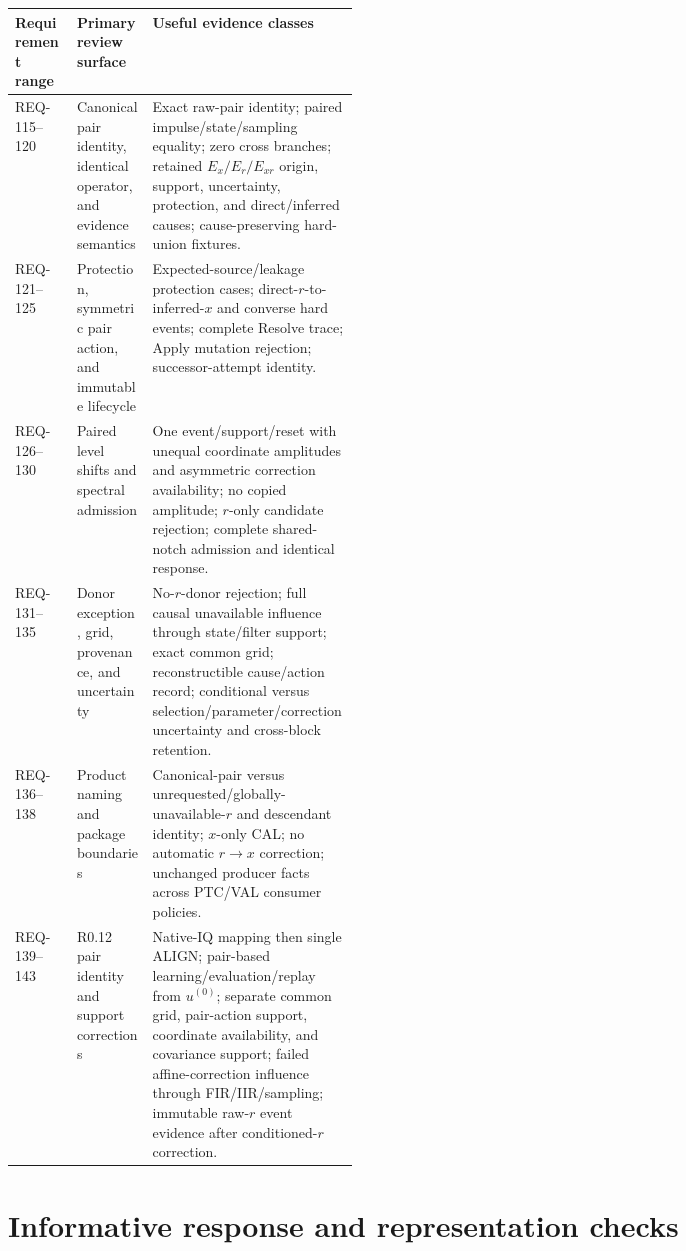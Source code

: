 \documentclass[10pt]{article}
\begin{document}
\clearpage
\footnotesize
\begin{tabularx}{\linewidth}{@{}p{0.18\linewidth}p{0.22\linewidth}X@{}}
\toprule
Requirement range & Primary review surface & Useful evidence classes \\
\midrule
REQ-115--120 & Canonical pair identity, identical operator, and evidence semantics & Exact raw-pair identity; paired impulse/state/sampling equality; zero cross branches; retained $E_x/E_r/E_{xr}$ origin, support, uncertainty, protection, and direct/inferred causes; cause-preserving hard-union fixtures. \\
REQ-121--125 & Protection, symmetric pair action, and immutable lifecycle & Expected-source/leakage protection cases; direct-$r$-to-inferred-$x$ and converse hard events; complete Resolve trace; Apply mutation rejection; successor-attempt identity. \\
REQ-126--130 & Paired level shifts and spectral admission & One event/support/reset with unequal coordinate amplitudes and asymmetric correction availability; no copied amplitude; $r$-only candidate rejection; complete shared-notch admission and identical response. \\
REQ-131--135 & Donor exception, grid, provenance, and uncertainty & No-$r$-donor rejection; full causal unavailable influence through state/filter support; exact common grid; reconstructible cause/action record; conditional versus selection/parameter/correction uncertainty and cross-block retention. \\
REQ-136--138 & Product naming and package boundaries & Canonical-pair versus unrequested/globally-unavailable-$r$ and descendant identity; $x$-only CAL; no automatic $r\rightarrow x$ correction; unchanged producer facts across PTC/VAL consumer policies. \\
REQ-139--143 & R0.12 pair identity and support corrections & Native-IQ mapping then single ALIGN; pair-based learning/evaluation/replay from $u^{(0)}$; separate common grid, pair-action support, coordinate availability, and covariance support; failed affine-correction influence through FIR/IIR/sampling; immutable raw-$r$ event evidence after conditioned-$r$ correction. \\
\bottomrule
\end{tabularx}
\normalsize

\section{Informative response and representation checks}
\label{sec:eng-response}
\end{document}
